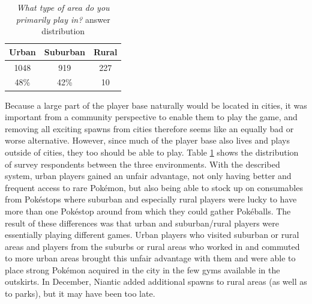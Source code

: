 \begin{table}[h]
	\centering
	\caption{\emph{What type of area do you primarily play in?} answer distribution}
	\label{tbl:urban-level-distribution}
	\begin{tabular}{|c|c|c|}
		\hline
		\textbf{Urban} & \textbf{Suburban} & \textbf{Rural}\\
		\hline\hline
		1048	& 919	& 227\\
		48\%	& 42\%	& 10\\\hline
	\end{tabular}
\end{table}

Because a large part of the player base naturally would be located in cities, it was important from a community perspective to enable them to play the game, and removing all exciting spawns from cities therefore seems like an equally bad or worse alternative. However, since much of the player base also lives and plays outside of cities, they too should be able to play. Table \ref{tbl:urban-level-distribution} shows the distribution of survey respondents between the three environments. With the described system, urban players gained an unfair advantage, not only having better and frequent access to rare Pokémon, but also being able to stock up on consumables from Pokéstops where suburban and especially rural players were lucky to have more than one Pokéstop around from which they could gather Pokéballs. The result of these differences was that urban and suburban/rural players were essentially playing different games. Urban players who visited suburban or rural areas and players from the suburbs or rural areas who worked in and commuted to more urban areas brought this unfair advantage with them and were able to place strong Pokémon acquired in the city in the few gyms available in the outskirts. In December, Niantic added additional spawns to rural areas (as well as to parks), but it may have been too late. 


